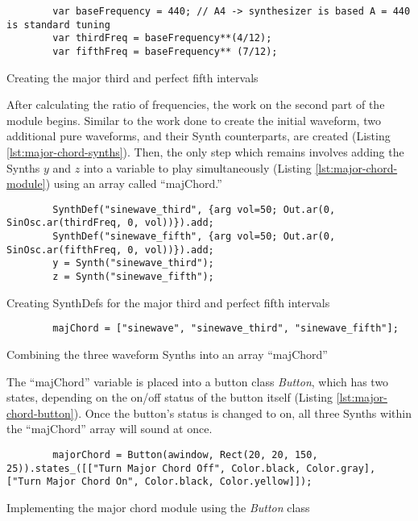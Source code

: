 \begin{listing}
	\begin{lstlisting}
		var baseFrequency = 440; // A4 -> synthesizer is based A = 440 is standard tuning
		var thirdFreq = baseFrequency**(4/12);
		var fifthFreq = baseFrequency** (7/12);
	\end{lstlisting}
	\label{lst:chord-creation}
	\caption{Creating the major third and perfect fifth intervals}
\end{listing}

After calculating the ratio of frequencies, the work on the second part of the module begins. Similar to the work done to create the initial waveform, two additional pure waveforms, and their Synth counterparts, are created (Listing \ref{lst:major-chord-synths}). Then, the only step which remains involves adding the Synths $y$ and $z$ into a variable to play simultaneously (Listing \ref{lst:major-chord-module}) using an array called ``majChord.''

\begin{listing}
	\begin{lstlisting}
		SynthDef("sinewave_third", {arg vol=50; Out.ar(0, SinOsc.ar(thirdFreq, 0, vol))}).add;
		SynthDef("sinewave_fifth", {arg vol=50; Out.ar(0, SinOsc.ar(fifthFreq, 0, vol))}).add;
		y = Synth("sinewave_third");
		z = Synth("sinewave_fifth");
	\end{lstlisting}
	\label{lst:major-chord-synths}
	\caption{Creating SynthDefs for the major third and perfect fifth intervals}	
\end{listing}

\begin{listing}
	\begin{lstlisting}
		majChord = ["sinewave", "sinewave_third", "sinewave_fifth"];
	\end{lstlisting}
	\label{lst:major-chord-module}
	\caption{Combining the three waveform Synths into an array ``majChord''}
\end{listing}

The ``majChord'' variable is placed into a button class \textit{Button}, which has two states, depending on the on/off status of the button itself (Listing \ref{lst:major-chord-button}). Once the button's status is changed to on, all three Synths within the ``majChord'' array will sound at once.

\begin{listing}
	\begin{lstlisting}
		majorChord = Button(awindow, Rect(20, 20, 150, 25)).states_([["Turn Major Chord Off", Color.black, Color.gray], ["Turn Major Chord On", Color.black, Color.yellow]]);	
	\end{lstlisting}
	\label{lst:major-chord-button}
	\caption{Implementing the major chord module using the \textit{Button} class}
\end{listing}

